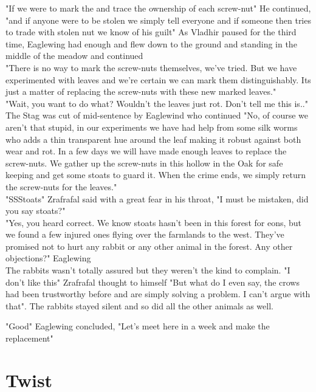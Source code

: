 \documentclass[smalldemyvopaper,11pt,twoside,onecolumn,openright,extrafontsizes]{memoir}
\begin{document}
"If we were to mark the and trace the ownership of each screw-nut" He continued, "and if anyone were to be stolen we simply tell everyone and if someone then tries to trade with stolen nut we know of his guilt" As Vladhir paused for the third time, Eaglewing had enough and flew down to the ground and standing in the middle of the meadow and continued \\

"There is no way to mark the screw-nuts themselves, we've tried. But we have experimented with leaves and we're certain we can mark them distinguishably. Its just a matter of replacing the screw-nuts with these new marked leaves."\\

"Wait, you want to do what? Wouldn't the leaves just rot. Don't tell me this is.." The Stag was cut of mid-sentence by Eaglewind who continued
"No, of course we aren't that stupid, in our experiments we have had help from some silk worms who adds a thin transparent hue around the leaf making it robust against both wear and rot. In a few days we will have made enough leaves to replace the screw-nuts. We gather up the screw-nuts in this hollow in the Oak for safe keeping and get some stoats to guard it. When the crime ends, we simply return the screw-nuts for the leaves."\\

"SSStoats" Zrafrafal said with a great fear in his throat, "I must be mistaken, did you say stoats?"\\

"Yes, you heard correct. We know stoats hasn't been in this forest for eons, but we found a few injured ones flying over the farmlands to the west. They've promised not to hurt any rabbit or any other animal in the forest. Any other objections?" Eaglewing  \\

The rabbits wasn't totally assured but they weren't the kind to complain. "I don't like this" Zrafrafal thought to himself "But what do I even say, the crows had been trustworthy before and are simply solving a problem. I can't argue with that". The rabbits stayed silent and so did all the other animals as well.

"Good" Eaglewing concluded, "Let's meet here in a week and make the replacement"


\chapter{Twist}
\end{document}
